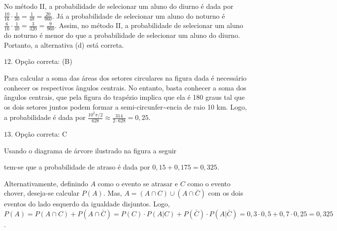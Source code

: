 No método II, a probabilidade de selecionar um aluno do diurno é dada por \(\frac{10}{16}\cdot\frac{1}{30}=\frac{1}{48}=\frac{20}{960}\). Já a probabilidade de selecionar um aluno do noturno é \(\frac{6}{16}\cdot \frac{1}{40}=\frac{3}{320}=\frac{9}{960}\). Assim, no método II, a probabilidade de selecionar um aluno do noturno é menor do que a probabilidade de selecionar um aluno do diurno. Portanto, a alternativa (d) está correta.

\(12.\) Opção correta: (B)

Para calcular a soma das áreas dos setores circulares na figura dada é necessário conhecer os respectivos ângulos centrais. No entanto, basta conhecer a soma dos ângulos centrais, que pela figura do trapézio implica que ela é 180 graus tal que os dois setores juntos podem formar a semi-circunfer\textasciitilde{}encia de raio 10 km. Logo, a probabilidade é dada por \(\frac{10^2\pi/2}{628}\approx \frac{314}{2\cdot 628} =0,25.\)

\(13.\) Opção correta: C

Usando o diagrama de árvore ilustrado na figura a seguir
\begin{center}\end{center}
tem-se que a probabilidade de atraso é dada por \(0,15+0,175=0,325.\)

Alternativamente, definindo \(A\) como o evento se atrasar e \(C\) como o evento chover, deseja-se calcular \(P(A)\). Mas, \(A=(A\cap C) \cup (A\cap \bar{C})\) com os dois eventos do lado esquerdo da igualdade disjuntos. Logo, \(P(A)=P(A\cap C)+P(A\cap \bar{C})=P(C)\cdot P(A|C)+P(\bar{C})\cdot P(A|\bar{C})=0,3\cdot 0,5+0,7\cdot 0,25=0,325\).

